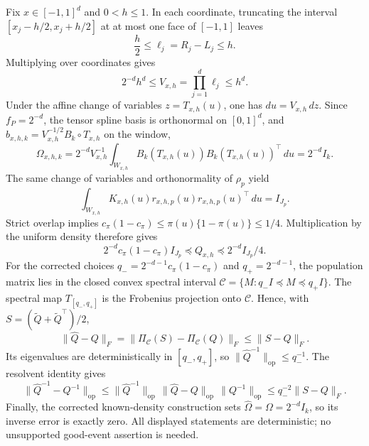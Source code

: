 Fix \(x\in[-1,1]^d\) and \(0<h\le1\). In each coordinate, truncating the interval \([x_j-h/2,x_j+h/2]\) at at most one face of \([-1,1]\) leaves
\[
\frac h2\le \ell_j=R_j-L_j\le h.
\]
Multiplying over coordinates gives
\[
2^{-d}h^d\le V_{x,h}=\prod_{j=1}^d\ell_j\le h^d.
\]
Under the affine change of variables \(z=T_{x,h}(u)\), one has \(du=V_{x,h}\,dz\). Since \(f_P=2^{-d}\), the tensor spline basis is orthonormal on \([0,1]^d\), and \(b_{x,h,k}=V_{x,h}^{-1/2}B_k\circ T_{x,h}\) on the window,
\[
\Omega_{x,h,k}
=2^{-d}V_{x,h}^{-1}\int_{W_{x,h}}B_k(T_{x,h}(u))B_k(T_{x,h}(u))^\top\,du
=2^{-d}I_k.
\]
The same change of variables and orthonormality of \(\rho_p\) yield
\[
\int_{W_{x,h}}K_{x,h}(u)r_{x,h,p}(u)r_{x,h,p}(u)^\top\,du=I_{J_p}.
\]
Strict overlap implies \(c_\pi(1-c_\pi)\le\pi(u)\{1-\pi(u)\}\le1/4\). Multiplication by the uniform density therefore gives
\[
2^{-d}c_\pi(1-c_\pi)I_{J_p}
\preceq Q_{x,h}
\preceq 2^{-d}I_{J_p}/4.
\]
For the corrected choices \(q_-=2^{-d-1}c_\pi(1-c_\pi)\) and \(q_+=2^{-d-1}\), the population matrix lies in the closed convex spectral interval \(\mathcal C=\{M:q_-I\preceq M\preceq q_+I\}\). The spectral map \(T_{[q_-,q_+]}\) is the Frobenius projection onto \(\mathcal C\). Hence, with \(S=(\widetilde Q+\widetilde Q^\top)/2\),
\[
\|\widehat Q-Q\|_F=\|\Pi_{\mathcal C}(S)-\Pi_{\mathcal C}(Q)\|_F\le\|S-Q\|_F.
\]
Its eigenvalues are deterministically in \([q_-,q_+]\), so \(\|\widehat Q^{-1}\|_{\mathrm{op}}\le q_-^{-1}\). The resolvent identity gives
\[
\|\widehat Q^{-1}-Q^{-1}\|_{\mathrm{op}}
\le \|\widehat Q^{-1}\|_{\mathrm{op}}\,\|\widehat Q-Q\|_{\mathrm{op}}\,\|Q^{-1}\|_{\mathrm{op}}
\le q_-^{-2}\|S-Q\|_F.
\]
Finally, the corrected known-density construction sets \(\widehat\Omega=\Omega=2^{-d}I_k\), so its inverse error is exactly zero. All displayed statements are deterministic; no unsupported good-event assertion is needed.